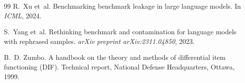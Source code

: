 \documentclass[11pt]{article}
\begin{document}
\begin{thebibliography}{99}
R.~Xu et~al.
\newblock Benchmarking benchmark leakage in large language models.
\newblock In \emph{ICML}, 2024.

S.~Yang et~al.
\newblock Rethinking benchmark and contamination for language models with rephrased samples.
\newblock \emph{arXiv preprint arXiv:2311.04850}, 2023.

B.~D. Zumbo.
\newblock A handbook on the theory and methods of differential item functioning ({DIF}).
\newblock Technical report, National Defense Headquarters, Ottawa, 1999.

\end{thebibliography}
\end{document}
